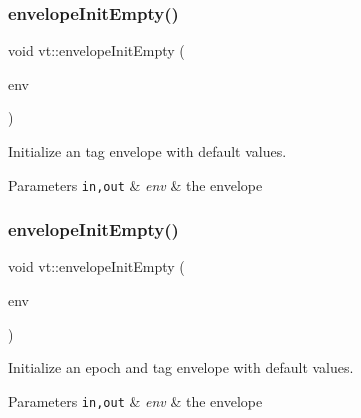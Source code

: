\subsubsection{\texorpdfstring{envelope\+Init\+Empty()}{envelopeInitEmpty()}\hspace{0.1cm}{\footnotesize\ttfamily [4/5]}}
{\footnotesize\ttfamily void vt\+::envelope\+Init\+Empty (\begin{DoxyParamCaption}\item[{\hyperlink{namespacevt_a7b951ab92dca9319e12e3fc406ccb309}{Tag\+Envelope} \&}]{env }\end{DoxyParamCaption})\hspace{0.3cm}{\ttfamily [inline]}}



Initialize an tag envelope with default values. 


\begin{DoxyParams}[1]{Parameters}
\mbox{\tt in,out}  & {\em env} & the envelope \\
\hline
\end{DoxyParams}
\mbox{\label{namespacevt_a358f72f3e1d5ce12cca7d622ee512302}} 
\subsubsection{\texorpdfstring{envelope\+Init\+Empty()}{envelopeInitEmpty()}\hspace{0.1cm}{\footnotesize\ttfamily [5/5]}}
{\footnotesize\ttfamily void vt\+::envelope\+Init\+Empty (\begin{DoxyParamCaption}\item[{\hyperlink{namespacevt_af23b58014ced6898422213a0e5e6a27a}{Epoch\+Tag\+Envelope} \&}]{env }\end{DoxyParamCaption})\hspace{0.3cm}{\ttfamily [inline]}}



Initialize an epoch and tag envelope with default values. 


\begin{DoxyParams}[1]{Parameters}
\mbox{\tt in,out}  & {\em env} & the envelope \\
\hline
\end{DoxyParams}
\mbox{\label{namespacevt_ace3e4542ae09ecd9728bea6548d71d5a}} 
